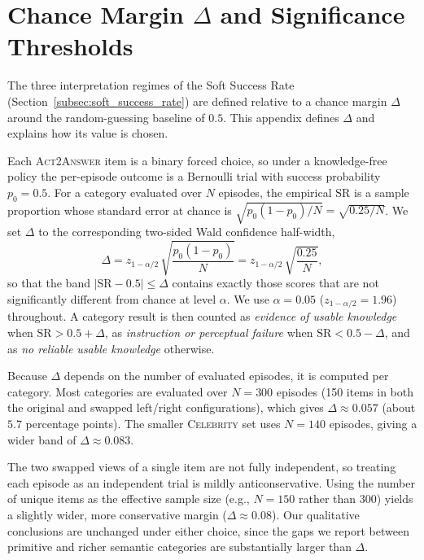 \documentclass[11pt]{article}
\begin{document}
\section{Chance Margin $\Delta$ and Significance Thresholds}
\label{appendix:delta}

The three interpretation regimes of the Soft Success Rate (Section~\ref{subsec:soft_success_rate}) are defined relative to a chance margin $\Delta$ around the random-guessing baseline of $0.5$. This appendix defines $\Delta$ and explains how its value is chosen.

Each \textsc{Act2Answer} item is a binary forced choice, so under a knowledge-free policy the per-episode outcome is a Bernoulli trial with success probability $p_0 = 0.5$. For a category evaluated over $N$ episodes, the empirical $\mathrm{SR}$ is a sample proportion whose standard error at chance is $\sqrt{p_0(1-p_0)/N} = \sqrt{0.25/N}$. We set $\Delta$ to the corresponding two-sided Wald confidence half-width,
\begin{equation}
\Delta = z_{1-\alpha/2}\,\sqrt{\frac{p_0(1-p_0)}{N}} = z_{1-\alpha/2}\,\sqrt{\frac{0.25}{N}},
\end{equation}
so that the band $|\mathrm{SR}-0.5| \le \Delta$ contains exactly those scores that are not significantly different from chance at level $\alpha$. We use $\alpha = 0.05$ ($z_{1-\alpha/2} = 1.96$) throughout. A category result is then counted as \emph{evidence of usable knowledge} when $\mathrm{SR} > 0.5 + \Delta$, as \emph{instruction or perceptual failure} when $\mathrm{SR} < 0.5 - \Delta$, and as \emph{no reliable usable knowledge} otherwise.

Because $\Delta$ depends on the number of evaluated episodes, it is computed per category. Most categories are evaluated over $N = 300$ episodes (150 items in both the original and swapped left/right configurations), which gives $\Delta \approx 0.057$ (about $5.7$ percentage points). The smaller \textsc{Celebrity} set uses $N = 140$ episodes, giving a wider band of $\Delta \approx 0.083$.

The two swapped views of a single item are not fully independent, so treating each episode as an independent trial is mildly anticonservative. Using the number of unique items as the effective sample size (e.g., $N = 150$ rather than $300$) yields a slightly wider, more conservative margin ($\Delta \approx 0.08$). Our qualitative conclusions are unchanged under either choice, since the gaps we report between primitive and richer semantic categories are substantially larger than $\Delta$.
\end{document}

